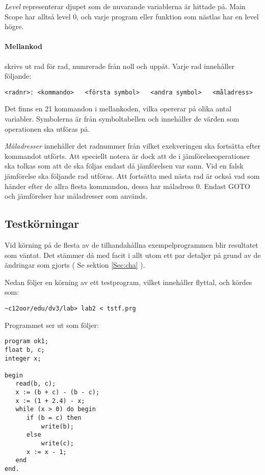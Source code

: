 		\textit{Level} representerar djupet som de nuvarande variablerna är hittade på. Main Scope har alltså level 0, och varje program eller funktion som nästlas har en level högre.
		
		\paragraph{Mellankod}
		skrivs ut rad för rad, numrerade från noll och uppåt. Varje rad innehåller följande:

\begin{verbatim}
<radnr>: <kommando>   <första symbol>   <andra symbol>   <måladress>
\end{verbatim}

	Det finns en 21 kommandon i mellankoden, vilka opererar på olika antal variabler. Symbolerna är från symboltabellen och innehåller de värden som operationen ska utföras på. 
	
	\textit{Måladresser} innehåller det radnummer från vilket exekveringen ska fortsätta efter kommandot utförts. Att speciellt notera är dock att de i jämförelseoperationer ska tolkas som att de ska följas endast då jämförelsen var sann. Vid en falsk jämförelse ska följande rad utföras. Att fortsätta med nästa rad är också vad som händer efter de allra flesta kommandon, dessa har måladress 0. Endast GOTO och jämförelser har måladresser som används. 
	
	\subsection{Testkörningar}
	
		Vid körning på de flesta av de tilhandahållna exempelprogrammen blir resultatet som väntat. Det stämmer då med facit i allt utom ett par detaljer på grund av de ändringar som gjorts ( Se sektion \ref{Sec:cha} ).	
		
		
		Nedan följer en körning av ett testprogram, vilket innehåller flyttal, och kördes som:
\begin{verbatim}
~c12oor/edu/dv3/lab> lab2 < tstf.prg 
\end{verbatim}

		Programmet ser ut som följer:

\begin{footnotesize}
\begin{verbatim}
program ok1;
float b, c;
integer x;

begin
   read(b, c);
   x := (b + c) - (b - c);
   x := (1 + 2.4) - x;
   while (x > 0) do begin
      if (b = c) then
          write(b);
      else
          write(c);
      x := x - 1;
   end
end.
\end{verbatim}\end{footnotesize}

